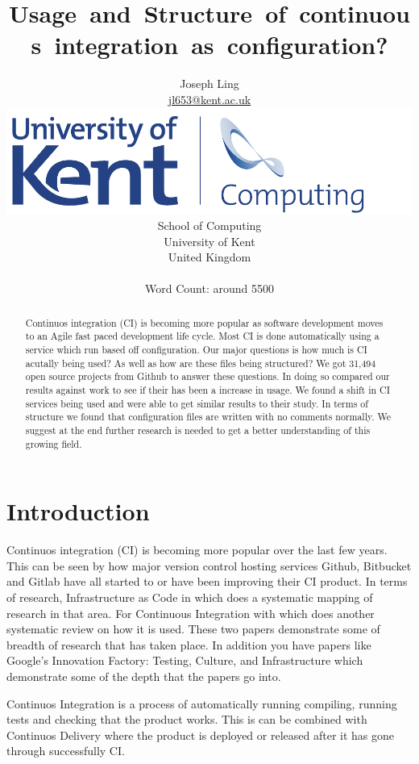 \documentclass[twoside,12pt,titlepage,a4paper]{article}
\title{Usage and Structure of continuous integration as configuration?}
\author{Joseph Ling\\\vspace{10mm}
\url{jl653@kent.ac.uk} \\ \vspace{5mm}
\includegraphics[scale=0.6]{Kent_Comp_294_RGB} \\
School of Computing \\
University of Kent \\
United Kingdom \\ \vspace{10mm} \\ Word Count: around 5500}
\begin{document}
\maketitle
\restoregeometry              %

\begin{abstract}
  Continuos integration (CI) is becoming more popular as software development moves to an Agile fast paced development life cycle. Most CI is done automatically using a service which run based off configuration. Our major questions is how much is CI acutally being used? As well as how are these files being structured? We got 31,494 open source projects from Github to answer these questions. In doing so compared our results against \citet{Hilton2016} work to see if their has been a increase in usage. We found a shift in CI services being used and were able to get similar results to their study. In terms of structure we found that configuration files are written with no comments normally. We suggest at the end further research is needed to get a better understanding of this growing field.    
\end{abstract}

\section{Introduction}
\label{Introduction}

Continuos integration (CI) is becoming more popular over the last few years. This can be seen by how major version control hosting services Github, Bitbucket and Gitlab have all started to or have been improving their CI product. In terms of research, Infrastructure as Code in \citet{Rahman2019} which does a systematic mapping of research in that area. For Continuous Integration with \citet{Shahin2017} which does another systematic review on how it is used. These two papers demonstrate some of breadth of research that has taken place. In addition you have papers like Google's Innovation Factory: Testing, Culture, and Infrastructure \citet{Copeland2010} which demonstrate some of the depth that the papers go into.

Continuos Integration is a process of automatically running compiling, running tests and checking that the product works. This is can be combined with Continuos Delivery where the product is deployed or released after it has gone through successfully CI. 
\end{document}
